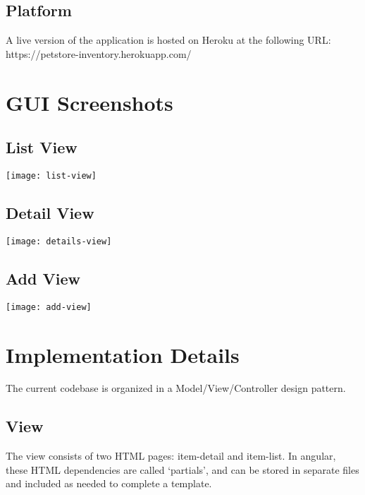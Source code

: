 \documentclass[letterpaper, 12pt]{article}
\begin{document}
\subsection{Platform}

\noindent A live version of the application is hosted on Heroku at the following URL:\\
https://petstore-inventory.herokuapp.com/

\section{GUI Screenshots}

%
%
\subsection{List View}
  \begin{centering}
  \texttt{[image: list-view]}
    \end{centering}
%
\subsection{Detail View}
  \begin{centering}
  \texttt{[image: details-view]}
    \end{centering}
%
\subsection{Add View}
  \begin{centering}
  \texttt{[image: add-view]}
    \end{centering}
    
\section{Implementation Details}
\noindent The current codebase is organized in a Model/View/Controller design pattern.

\subsection{View}
\noindent The view consists of two HTML pages: item-detail and item-list. In angular, these HTML dependencies are called `partials', and can be stored in separate files and included as needed to complete a template.

\hspace{1mm}
\end{document}
